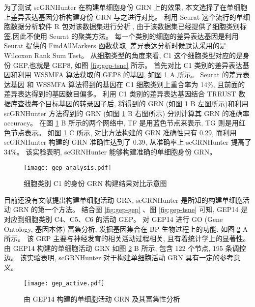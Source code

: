 为了测试 scGRNHunter 在构建单细胞身份 GRN 上的效果,
本文选择了在单细胞上差异表达基因分析构建身份 GRN 与之进行对比。 
利用 Seurat 这个流行的单细胞数据分析软件 R 包对该数据集进行分析,
由于该数据集已经提供了细胞类别标签,因此不使用 Seurat 的聚类方法。
每一个类别的细胞的差异表达基因是利用 Seurat 提供的 FindAllMarkers 函数获取, 
差异表达分析时候默认采用的是 Wilcoxon Rank Sum Test。
从细胞类型的角度来看, 
C1 这个细胞类型对应的是身份 GEP,也就是 GEP8, 如图 \ref{fig:gep-tsne} 所示。
首先对比 C1 类别的差异表达基因和利用 WSSMFA 算法获取的 GEP8 的基因, 如图 \ref{fig:gep-grn-comparison} A 所示。
Seurat 的差异表达基因 和 WSSMFA 算法得到的基因在 C1 细胞类别上重合率为 14\%, 且前面的差异表达得到的基因数目偏多。 
利用 C1 类别的差异表达基因结合 TRRUST 数据库查找每个目标基因的转录因子后, 
将得到的 GRN (如图 \ref{fig:gep-grn-comparison} B 左图所示)和利用 scGRNHunter 方法得到的 GRN (如图 \ref{fig:gep-grn-comparison} B 右图所示)
分别计算其 GRN 的准确率 accuracy。
在图 \ref{fig:gep-grn-comparison} B 所示的两个网络中, TF 是用蓝色节点来表示, TG 则是用红色节点表示。
如图 \ref{fig:gep-grn-comparison} C 所示, 对比方法构建的 GRN 准确性只有 0.29, 
而利用 scGRNHunter 构建的 GRN 准确性达到了 0.39, 从准确率上 scGRNHunter 提高了 34\%。
该实验表明, scGRNHunter 能够构建准确的单细胞身份 GRN。

\begin{figure}[!htbp]
    \centering
    \texttt{[image: gep\_analysis.pdf]}
    \caption{细胞类别 C1 的身份 GRN 构建结果对比示意图}
    \label{fig:gep-grn-comparison}
\end{figure}


目前还没有文献提出构建单细胞活动 GRN, 
scGRNHunter 是所知的构建单细胞活动 GRN 的第一个方法。
结合图 \ref{fig:gep-gep} 、图 \ref{fig:gep-tsne} 可知, 
GEP14 是对应到细胞类别 C4、C5、C6 的活动 GEP。
对 GEP14 进行 GO (Gene Ontology, 基因本体) 富集分析, 发掘基因集合在 BP 生物过程上的功能, 如图 \ref{fig:gep-active} A 所示。
该 GEP 主要与神经发育的相关活动过程相关, 且有着统计学上的显著性。
由 GEP14 构建的单细胞活动 GRN 如图 \ref{fig:gep-active} B 所示, 包含 122 个节点, 195 条调控边。
该实验表明, scGRNHunter 对于构建单细胞活动 GRN 具有一定的参考意义。

\begin{figure}[!htbp]
    \centering
    \texttt{[image: gep\_active.pdf]}
    \caption{由 GEP14 构建的单细胞活动 GRN 及其富集性分析}
    \label{fig:gep-active}
\end{figure}

